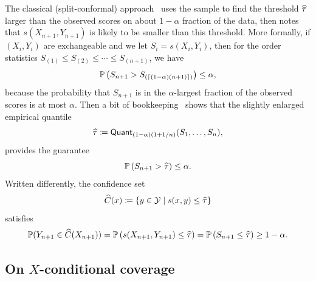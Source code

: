 \documentclass{article}
\newcommand{\scorefunc}{s}
\newcommand{\scoreval}{\scorefunc}
\newcommand{\scorerv}{S}
\newcommand{\quant}{\mathsf{Quant}}
\begin{document}
The classical (split-conformal) approach~\cite{VovkGaSh05,BarberCaRaTi21a}
uses the sample to find the threshold $\widehat{\tau}$ larger than the
observed scores on about $1 - \alpha$ fraction of the data, then notes that
$\scoreval(X_{n + 1}, Y_{n + 1})$ is likely to be smaller than this
threshold.
%
More formally, if $(X_i, Y_i)$ are exchangeable and we let $\scorerv_i =
\scoreval(X_i, Y_i)$, then for the order statistics $\scorerv_{(1)} \le
\scorerv_{(2)} \le \cdots \le \scorerv_{(n + 1)}$, we have
\begin{equation*}
  \P\left(\scorerv_{n + 1} > \scorerv_{(\ceil{(1 - \alpha) (n + 1)})}\right)
  \le \alpha,
\end{equation*}
because the probability that $S_{n + 1}$ is in the $\alpha$-largest fraction
of the observed scores is at most $\alpha$.
%
Then a bit of
bookkeeping~\cite[e.g.][Lemma 2]{RomanoPaCa19} shows that the
slightly enlarged empirical quantile
\begin{equation*}
  \what{\tau} \defeq \quant_{(1 - \alpha)(1 + 1/n)}(\scorerv_1, \ldots,
  \scorerv_n),
\end{equation*}
provides the guarantee
\begin{equation*}
  \P\left(\scorerv_{n + 1} > \what{\tau}\right) \le \alpha.
\end{equation*}
Written differently, the confidence set
\begin{equation*}
  \what{C}(x) \defeq \left\{y \in \mc{Y}
  \mid \scorefunc(x, y) \le \what{\tau}\right\}
\end{equation*}
satisfies
\begin{equation*}
  \P(Y_{n + 1} \in \what{C}(X_{n + 1}))
  = \P\left(\scorefunc(X_{n + 1}, Y_{n + 1}) \le \what{\tau}\right)
  = \P\left(\scorerv_{n + 1} \le \what{\tau}\right) \ge 1 - \alpha.
\end{equation*}

\subsection{On $X$-conditional coverage}
\label{sec:intro-x-conditional}
\end{document}
